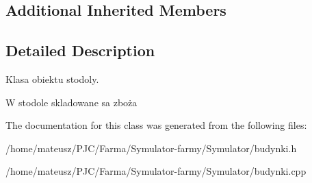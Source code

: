 \subsection*{Additional Inherited Members}


\subsection{Detailed Description}
Klasa obiektu stodoly. 

W stodole skladowane sa zboża 

The documentation for this class was generated from the following files\+:\begin{DoxyCompactItemize}
\item 
/home/mateusz/\+P\+J\+C/\+Farma/\+Symulator-\/farmy/\+Symulator/budynki.\+h\item 
/home/mateusz/\+P\+J\+C/\+Farma/\+Symulator-\/farmy/\+Symulator/budynki.\+cpp\end{DoxyCompactItemize}
